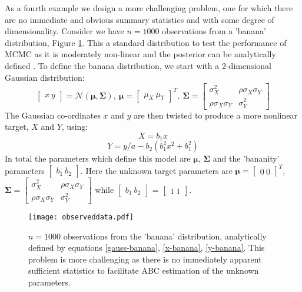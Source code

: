 As a fourth example we design a more challenging problem, one for which there are no immediate and obvious summary statistics and with some degree of dimensionality. Consider we have $n = 1000$ observations from a 'banana' distribution, Figure \ref{banana-data}. This a standard distribution to test the performance of MCMC as it is moderately non-linear and the posterior can be analytically defined \citep{Haario1999}. To define the banana distribution, we start with a 2-dimensional Gaussian distribution:
\begin{equation}
\begin{bmatrix}
x\ y
\end{bmatrix}=\mathcal{N}(\bm{\mu},\bm{\Sigma}),\ \bm{\mu} = \begin{bmatrix}
\mu_X\ \mu_Y
\end{bmatrix}^T,\ \bm{\Sigma} = \begin{bmatrix}
\sigma^2_X & \rho\sigma_X\sigma_Y\\
\rho\sigma_X\sigma_Y & \sigma^2_Y
\end{bmatrix} 
\label{gauss-banana}
\end{equation}
The Gaussian co-ordinates $x$ and $y$ are then twisted to produce a more nonlinear target, $X$ and $Y$, using:
\begin{equation}
X = b_1x
\label{x-banana}
\end{equation}
\begin{equation}
Y = y/a-b_2(b_1^2x^2+b_1^2)
\label{y-banana}
\end{equation}
In total the parameters which define this model are $\bm{\mu}$, $\bm{\Sigma}$ and the 'bananity' parameters $\begin{bmatrix}
b_1\ b_2
\end{bmatrix}$. Here the unknown target parameters are $\bm{\mu} = \begin{bmatrix}
0\ 0
\end{bmatrix}^T$,
$\bm{\Sigma} = \begin{bmatrix}
\sigma^2_X & \rho\sigma_X\sigma_Y\\
\rho\sigma_X\sigma_Y & \sigma^2_Y
\end{bmatrix}$ while $\begin{bmatrix}
b_1\ b_2
\end{bmatrix}$ = $\begin{bmatrix}
1\ 1
\end{bmatrix}$. 

\begin{figure}[H]
\centering
\texttt{[image: observeddata.pdf]}
\caption{$n = 1000$ observations from the 'banana' distribution, analytically defined by equations \ref{gauss-banana}, \ref{x-banana}, \ref{y-banana}. 
This problem is more challenging as there is no immediately apparent sufficient statistics to facilitate ABC estimation of the unknown parameters.}
\label{banana-data}
\end{figure}

